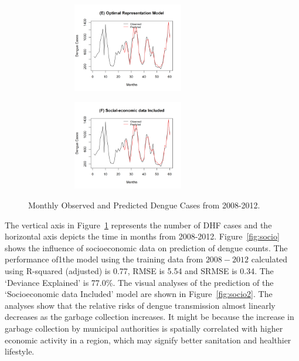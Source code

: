\documentclass{bmcart}
\begin{document}
\begin{figure}[htbp]
\begin{minipage}[c]{1.0\textwidth}
		\label{fig:test3} \par\vfill
		\includegraphics[width=9cm,height=3.9cm]{Pred-OptimalRepresentation}
		\label{fig:test4} \par\vfill
		\includegraphics[width=9cm,height=3.9cm]{Pred-SocialIncluded}
		\label{fig:test5}
	\end{minipage}
	\caption{Monthly Observed and Predicted Dengue Cases from 2008-2012.}
	\label{fig:lolo}
\end{figure}

The vertical axis in Figure~\ref{fig:lolo} represents the number of DHF cases and the horizontal axis depicts the time in months from 2008-2012. Figure~\ref{fig:socio} shows the influence of socioeconomic data on prediction of dengue counts. The performance of1the model using the training data from $2008-2012$ calculated using R-squared (adjusted) is 0.77, RMSE is 5.54 and SRMSE is 0.34. The `Deviance Explained' is 77.0\%. The visual analyses of the prediction of the `Socioeconomic data Included' model are shown in Figure~\ref{fig:socio2}. The analyses show that the relative risks of dengue transmission almost linearly decreases as the garbage collection increases. It might be because the increase in garbage collection by municipal authorities is spatially correlated with higher economic activity in a region, which may signify better sanitation and healthier lifestyle\cite{satterthwaite1997environmental}. 
\end{document}
